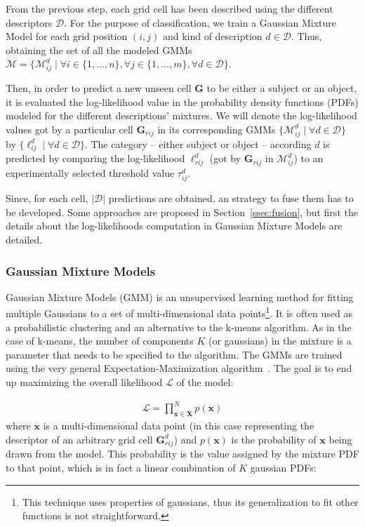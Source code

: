 \documentclass[10pt,twocolumn,letterpaper]{article}
\begin{document}
From the previous step, each grid cell has been described using the different descriptors $\mathcal{D}$. For the purpose of classification, we train a Gaussian Mixture Model for each grid position $(i,j)$ and kind of description $d \in \mathcal{D}$. Thus, obtaining the set of all the modeled GMMs $\mathcal{M} = \{\mathcal{M}_{ij}^{d} \;|\; \forall i \in \{1,...,n\}, \forall j \in \{1,...,m\}, \forall d \in \mathcal{D} \}$.

Then, in order to predict a new unseen cell $\mathbf{G}$ to be either a subject or an object, it is evaluated the log-likelihood value in the probability density functions (PDFs) modeled for the different descriptions' mixtures. We will denote the log-likelihood values got by a particular cell $\mathbf{G}_{rij}$ in its corresponding GMMs $\{\mathcal{M}_{ij}^{d} \;|\; \forall d \in \mathcal{D}\}$ by $\{\ell_{ij}^{d} \;|\; \forall d \in \mathcal{D}\}$. The category -- either subject or object -- according $d$ is predicted by comparing the log-likelihood $\ell_{rij}^{d}$ (got by $\mathbf{G}_{rij}$ in $\mathcal{M}_{ij}^{d}$) to an experimentally selected threshold value $\tau_{ij}^d$. 

Since, for each cell, $|\mathcal{D}|$ predictions are obtained, an strategy to fuse them has to be developed. Some approaches are proposed in Section~\ref{ssec:fusion}, but first the details about the log-likelihoods computation in Gaussian Mixture Models are detailed.

\subsubsection{Gaussian Mixture Models} \label{section:gmm}

Gaussian Mixture Models (GMM) is an unsupervised learning method for fitting multiple Gaussians to a set of multi-dimensional data points\footnote{This technique uses properties of gaussians, thus its generalization to fit other functions is not straightforward.}. It is often used as a probabilistic clustering and an alternative to the k-means algorithm. As in the case of k-means, the number of components $K$ (or gaussians) in the mixture is a parameter that needs to be specified to the algorithm. The GMMs are trained using the very general Expectation-Maximization algorithm~\cite{moon1996expectation}. The goal is to end up maximizing the overall likelihood $\mathcal{L}$ of the model:

\begin{gather}
	\mathcal{L} = \prod_{\mathbf{x} \in \mathbf{X}}^{N} p(\mathbf{x})
\end{gather}
where $\mathbf{x}$ is a multi-dimensional data point (in this case representing the descriptor of an arbitrary grid cell $\mathbf{G}_{rij}^{d}$) and $p(\mathbf{x})$ is the probability of $\mathbf{x}$ being drawn from the model. This probability is the value assigned by the mixture PDF to that point, which is in fact a linear combination of $K$ gaussian PDFs:
\end{document}
